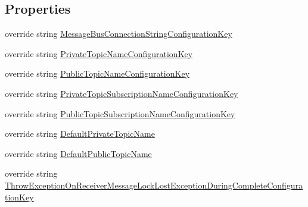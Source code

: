 \subsection*{Properties}
\begin{DoxyCompactItemize}
\item 
override string \hyperlink{classCqrs_1_1Azure_1_1ServiceBus_1_1AzureEventBus_a01cf73f187e77b2116e1f7dc68c3e7e6_a01cf73f187e77b2116e1f7dc68c3e7e6}{Message\+Bus\+Connection\+String\+Configuration\+Key}
\item 
override string \hyperlink{classCqrs_1_1Azure_1_1ServiceBus_1_1AzureEventBus_a822a0946e9848950c8be3b8f423fe20a_a822a0946e9848950c8be3b8f423fe20a}{Private\+Topic\+Name\+Configuration\+Key}
\item 
override string \hyperlink{classCqrs_1_1Azure_1_1ServiceBus_1_1AzureEventBus_a8428d6c874f19d4ae0cc42bb6ae3ab6d_a8428d6c874f19d4ae0cc42bb6ae3ab6d}{Public\+Topic\+Name\+Configuration\+Key}
\item 
override string \hyperlink{classCqrs_1_1Azure_1_1ServiceBus_1_1AzureEventBus_a112106688036d18c72fc02875b1b0a8b_a112106688036d18c72fc02875b1b0a8b}{Private\+Topic\+Subscription\+Name\+Configuration\+Key}
\item 
override string \hyperlink{classCqrs_1_1Azure_1_1ServiceBus_1_1AzureEventBus_ad09814d0307b01d36fe981cf4b997e79_ad09814d0307b01d36fe981cf4b997e79}{Public\+Topic\+Subscription\+Name\+Configuration\+Key}
\item 
override string \hyperlink{classCqrs_1_1Azure_1_1ServiceBus_1_1AzureEventBus_ad1951d2d7ccbf739e9390437d960b3f5_ad1951d2d7ccbf739e9390437d960b3f5}{Default\+Private\+Topic\+Name}
\item 
override string \hyperlink{classCqrs_1_1Azure_1_1ServiceBus_1_1AzureEventBus_a252a4ac7c235b7fbb44849fbdb08b0eb_a252a4ac7c235b7fbb44849fbdb08b0eb}{Default\+Public\+Topic\+Name}
\item 
override string \hyperlink{classCqrs_1_1Azure_1_1ServiceBus_1_1AzureEventBus_aaf0a0d07f6c5c1940cb633b362aa7177_aaf0a0d07f6c5c1940cb633b362aa7177}{Throw\+Exception\+On\+Receiver\+Message\+Lock\+Lost\+Exception\+During\+Complete\+Configuration\+Key}
\end{DoxyCompactItemize}
